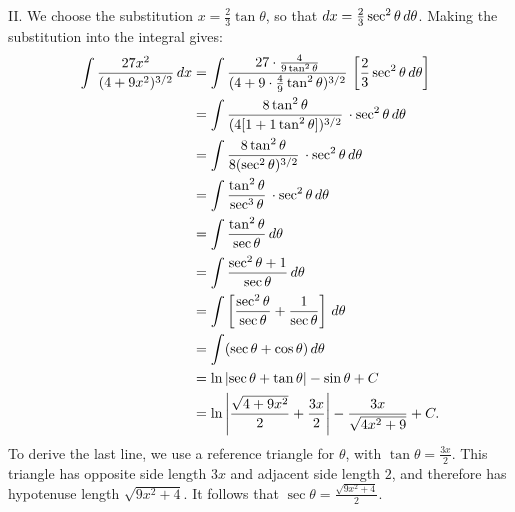 \documentclass[]{ximera}
\begin{document}
\begin{freeResponse}
II. We choose the substitution $ x = \frac{2}{3} \tan\theta$, so that $\mathop{}\!d x = \frac{2}{3} \sec^2 \theta \mathop{}\!d \theta$. Making the substitution into the integral gives:
\begin{align*}
\int \frac{27 x^2}{(4+9x^2)^{3/2}} \, dx & =  \int \dfrac{27 \cdot  \frac{4}{9 \tan^2 \theta}}{(4+9 \cdot \frac{4}{9}\tan^2 \theta)^{3/2}} \, \left[ \dfrac{2}{3} \sec^2 \theta \mathop{}\!d \theta \right] \\ 
&=  \int \dfrac{8 \tan^2 \theta}{ (4[1+1\tan^2 \theta])^{3/2}} \,  \cdot \sec^2 \theta \mathop{}\!d \theta  \\
&=  \int \dfrac{8 \tan^2 \theta}{8 (\sec^2 \theta)^{3/2}} \,  \cdot \sec^2 \theta \mathop{}\!d \theta  \\
&=  \int \dfrac{   \tan^2 \theta}{\sec^3 \theta} \,  \cdot \sec^2 \theta \mathop{}\!d \theta  \\
&=  \int \dfrac{   \tan^2 \theta}{\sec \theta} \mathop{}\!d \theta \\
&=  \int \dfrac{   \sec^2 \theta + 1}{\sec \theta} \,  d\theta  \\
&=  \int \left[\dfrac{   \sec^2 \theta}{\sec \theta} + \dfrac{1}{\sec \theta}\right] \,  d\theta  \\
&=  \int ( \sec \theta + \cos \theta )  \,  d\theta  \\
&=  \ln \left| \sec \theta + \tan \theta \right| - \sin \theta +C  \\
&= \ln \left| \dfrac{\sqrt{4+9x^2}}{2}+\dfrac{3x}{2} \right| - \dfrac{3x}{\sqrt{4x^2+9}} +C.
\end{align*}
To derive the last line, we use a reference triangle for $\theta$, with $\tan \theta = \frac{3x}{2}$. This triangle has opposite side length $3x$ and adjacent side length $2$, and therefore has hypotenuse length $\sqrt{9x^2 + 4}$. It follows that $\sec \theta = \frac{\sqrt{9x^2+4}}{2}$.


\end{freeResponse}
\end{document}
